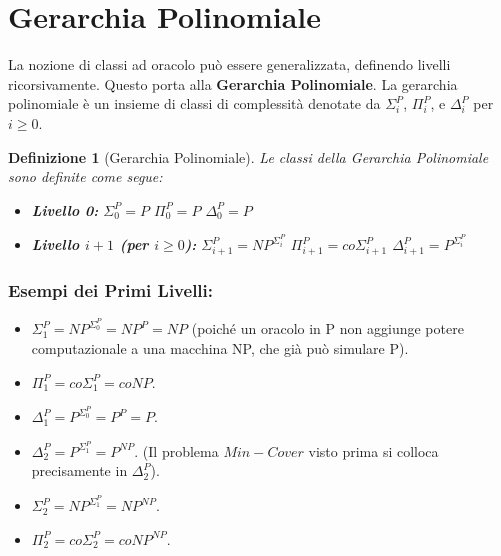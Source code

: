 \documentclass[a4paper, 11pt]{book} %
\newtheorem{definition}[theorem]{Definizione}
\theoremstyle{definition}
\begin{document}
\section{Gerarchia Polinomiale}
La nozione di classi ad oracolo può essere generalizzata, definendo livelli ricorsivamente. Questo porta alla \textbf{Gerarchia Polinomiale}.
La gerarchia polinomiale è un insieme di classi di complessità denotate da $\Sigma_i^P$, $\Pi_i^P$, e $\Delta_i^P$ per $i \ge 0$.

\begin{definition}[Gerarchia Polinomiale]
Le classi della Gerarchia Polinomiale sono definite come segue:
\begin{itemize}
    \item \textbf{Livello 0:}
    $\Sigma_0^P = P$
    $\Pi_0^P = P$
    $\Delta_0^P = P$
    \item \textbf{Livello $i+1$ (per $i \ge 0$):}
    $\Sigma_{i+1}^P = NP^{\Sigma_i^P}$
    $\Pi_{i+1}^P = co\Sigma_{i+1}^P$
    $\Delta_{i+1}^P = P^{\Sigma_i^P}$
\end{itemize}
\end{definition}

\subsubsection{Esempi dei Primi Livelli:}
\begin{itemize}
    \item $\Sigma_1^P = NP^{\Sigma_0^P} = NP^P = NP$ (poiché un oracolo in P non aggiunge potere computazionale a una macchina NP, che già può simulare P).
    \item $\Pi_1^P = co\Sigma_1^P = coNP$.
    \item $\Delta_1^P = P^{\Sigma_0^P} = P^P = P$.
    \item $\Delta_2^P = P^{\Sigma_1^P} = P^{NP}$. (Il problema $Min-Cover$ visto prima si colloca precisamente in $\Delta_2^P$).
    \item $\Sigma_2^P = NP^{\Sigma_1^P} = NP^{NP}$.
    \item $\Pi_2^P = co\Sigma_2^P = coNP^{NP}$.
\end{itemize}
\end{document}
